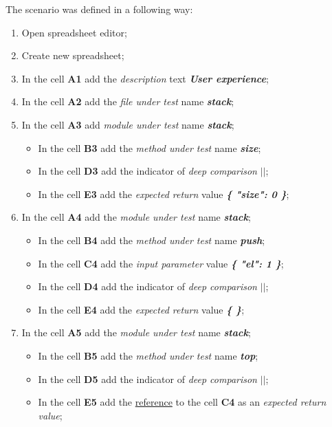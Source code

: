 The scenario was defined in a following way:
\begin{enumerate}
	\item Open spreadsheet editor;
	\item Create new spreadsheet;
	\item In the cell \textbf{A1} add the \textit{description} text\textit{ \textbf{User experience}};
	\item In the cell \textbf{A2} add the \textit{file under test} name \textit{\textbf{stack}};
	\item In the cell \textbf{A3} add  \textit{module under test} name \textit{\textbf{stack}};
	\begin{itemize}
		\item In the cell \textbf{B3} add the \textit{method under test} name \textit{\textbf{size}};
		\item In the cell \textbf{D3} add the indicator of \textit{deep comparison}\textit{ \textbf{$||$}};
		\item In the cell \textbf{E3} add the \textit{expected return} value \textit{\textbf{\{ "size": 0 \}}};
	\end{itemize}
	\item In the cell \textbf{A4} add the \textit{module under test} name\textit{ \textbf{stack}};
	\begin{itemize}
		\item In the cell \textbf{B4} add the \textit{method under test} name  \textit{\textbf{push}};
		\item In the cell \textbf{C4} add the \textit{input parameter} value \textit{\textbf{ \{ "el": 1 \}}};
		\item In the cell \textbf{D4} add the indicator of \textit{deep comparison}\textit{ \textbf{$||$}};
		\item In the cell \textbf{E4} add the \textit{expected return} value\textit{ \textbf{\{ \}}};
	\end{itemize}
	\item In the cell \textbf{A5} add the  \textit{module under test} name \textit{ \textbf{stack}};
	\begin{itemize}
		\item In the cell \textbf{B5} add the \textit{method under test} name \textit{\textbf{top}};
		\item In the cell \textbf{D5} add the indicator of \textit{deep comparison}\textit{ \textbf{$||$}};
		\item In the cell \textbf{E5} add the \underline{reference} to the cell \textbf{C4} as an \textit{expected return value};

\end{itemize}
\end{enumerate}
